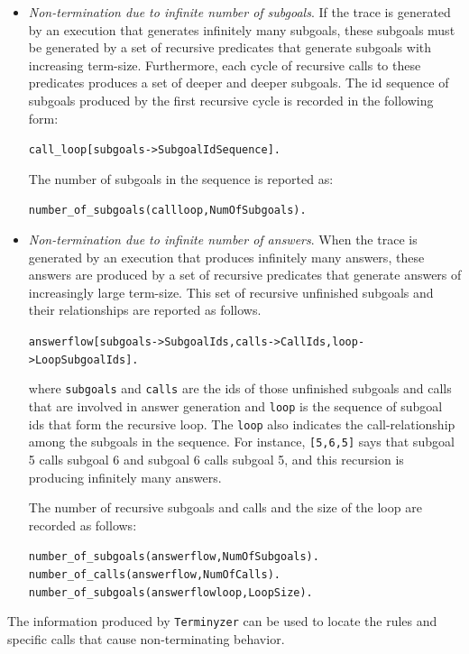 \documentclass[11pt]{article}
\begin{document}
\begin{itemize}
\item \emph{Non-termination due to infinite number of subgoals}. 
  If the trace is generated by an execution that
  generates infinitely many
  subgoals, these subgoals must be generated by a set of
  recursive predicates that generate subgoals with increasing term-size.
  Furthermore, each cycle of recursive calls to these predicates
  produces a set of deeper and deeper subgoals.
  The id sequence of subgoals produced by the first recursive cycle is
  recorded in the following form:
\begin{alltt}
   call\_loop[subgoals->SubgoalIdSequence].
\end{alltt}
  The number of subgoals in the sequence is reported as:
\begin{alltt}
   number\_of\_subgoals(callloop,NumOfSubgoals).
\end{alltt}
  
\item \emph{Non-termination due to infinite number of answers}. 
  When the trace is generated by an execution that produces
  infinitely many answers, these answers are produced by a set of
  recursive predicates that generate answers of increasingly large
  term-size.
  This set of recursive unfinished subgoals and their relationships
  are reported as follows. 
\begin{alltt}
   answerflow[subgoals->SubgoalIds,calls->CallIds,loop->LoopSubgoalIds].
\end{alltt}
  where {\tt subgoals} and {\tt calls} are the ids of those unfinished
  subgoals and calls that are involved in answer generation 
  and {\tt loop} is the sequence of subgoal ids that form the
  recursive loop. 
  The {\tt loop} also indicates the call-relationship among the subgoals in
  the sequence. 
  For instance, {\tt [5,6,5]} says
  that subgoal 5 calls subgoal 6 and subgoal 6 calls subgoal 5, and
  this recursion is producing infinitely many answers. 

  The number of recursive subgoals and calls and the size of the loop
  are recorded as follows:
\begin{alltt}
   number\_of\_subgoals(answerflow,NumOfSubgoals).\\
   number\_of\_calls(answerflow,NumOfCalls).\\
   number\_of\_subgoals(answerflowloop,LoopSize).
\end{alltt}
\end{itemize}
The information produced by {\tt Terminyzer} can be used to locate
the rules and specific calls that cause
non-terminating behavior.
\end{document}
